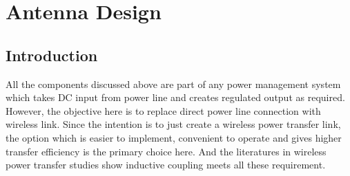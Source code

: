 \documentclass[12pt,a4paper,UKenglish]{report}
\begin{document}


\clearpage
\newpage




\chapter{Antenna Design}  

\section{Introduction}		%

All the components discussed above are part of any power management system which takes DC input from power line 
and creates regulated output as required. However, the objective here is to replace direct power line connection with 
wireless link. Since the intention is to just create a wireless power transfer link, the option which is easier to implement, 
convenient to operate and gives higher transfer efficiency is the primary choice here. And the literatures in wireless power 
transfer studies show inductive coupling meets all these requirement. \\
\end{document}
